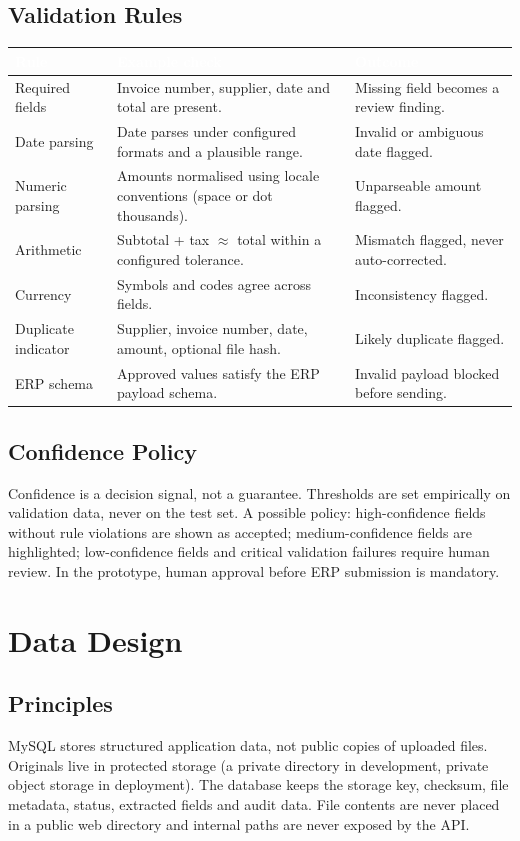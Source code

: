 \documentclass[11pt,a4paper]{report}
\newcommand{\hdr}[1]{\textcolor{white}{\sffamily\bfseries #1}}
\newcommand{\tblstart}{\rowcolors{2}{white}{rowgray}\arrayrulecolor{teal!60}}
\newcommand{\hdrrow}{\rowcolor{navy}}
\begin{document}
\section{Validation Rules}
{\tblstart\small
\begin{longtable}{L{3.0cm}L{6.3cm}L{4.5cm}}
\hdrrow \hdr{Rule} & \hdr{Example check} & \hdr{Outcome}\\ \endhead
Required fields & Invoice number, supplier, date and total are present. & Missing field becomes a review finding.\\
Date parsing & Date parses under configured formats and a plausible range. & Invalid or ambiguous date flagged.\\
Numeric parsing & Amounts normalised using locale conventions (space or dot thousands). & Unparseable amount flagged.\\
Arithmetic & Subtotal + tax $\approx$ total within a configured tolerance. & Mismatch flagged, never auto-corrected.\\
Currency & Symbols and codes agree across fields. & Inconsistency flagged.\\
Duplicate indicator & Supplier, invoice number, date, amount, optional file hash. & Likely duplicate flagged.\\
ERP schema & Approved values satisfy the ERP payload schema. & Invalid payload blocked before sending.\\
\hline
\end{longtable}}

\section{Confidence Policy}
Confidence is a decision signal, not a guarantee. Thresholds are set empirically on validation data, never on the test set. A possible policy: high-confidence fields without rule violations are shown as accepted; medium-confidence fields are highlighted; low-confidence fields and critical validation failures require human review. In the prototype, human approval before ERP submission is mandatory.

\chapter{Data Design}
\section{Principles}
MySQL stores structured application data, not public copies of uploaded files. Originals live in protected storage (a private directory in development, private object storage in deployment). The database keeps the storage key, checksum, file metadata, status, extracted fields and audit data. File contents are never placed in a public web directory and internal paths are never exposed by the API.
\end{document}
